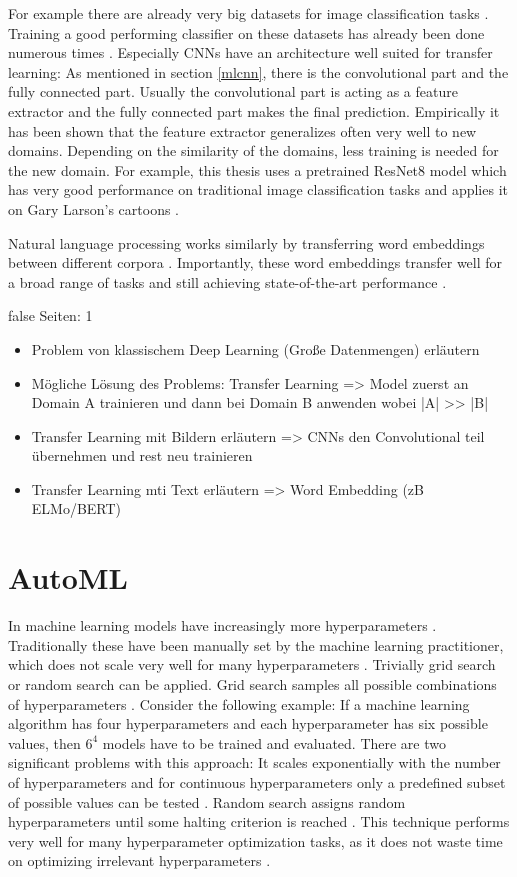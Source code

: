 \documentclass[draft,final,oneside]{vutinfth} %
\begin{document}
For example there are already very big datasets for image classification tasks \cite{alexnet}. Training a good performing classifier on these datasets has already been done numerous times \cite{resnet}\cite{alexnet}. Especially CNNs have an architecture well suited for transfer learning: As mentioned in section \ref{mlcnn}, there is the convolutional part and the fully connected part. Usually the convolutional part is acting as a feature extractor and the fully connected part makes the final prediction. Empirically it has been shown that the feature extractor generalizes often very well to new domains. Depending on the similarity of the domains, less training is needed for the new domain. For example, this thesis uses a pretrained ResNet8 model which has very good performance on traditional image classification tasks and applies it on Gary Larson's cartoons \cite{resnet}.

Natural language processing works similarly by transferring word embeddings between different corpora \cite{bert}. Importantly, these word embeddings transfer well for a broad range of tasks and still achieving state-of-the-art performance \cite{elmo}.


\if false
Seiten: 1
\begin{itemize}
\item Problem von klassischem Deep Learning (Große Datenmengen) erläutern
\item Mögliche Lösung des Problems: Transfer Learning => Model zuerst an Domain A trainieren und dann bei Domain B anwenden wobei |A| >> |B|
\item Transfer Learning mit Bildern erläutern => CNNs den Convolutional teil übernehmen und rest neu trainieren
\item Transfer Learning mti Text erläutern => Word Embedding (zB ELMo/BERT)
\end{itemize}
\fi


\section{AutoML} \label{automlbackground}

In machine learning models have increasingly more hyperparameters \cite{alexnet}\cite{resnet}. Traditionally these have been manually set by the machine learning practitioner, which does not scale very well for many hyperparameters \cite{aimodern}. Trivially grid search or random search can be applied. Grid search samples all possible combinations of hyperparameters \cite{automlsurvey}. Consider the following example: If a machine learning algorithm has four hyperparameters and each hyperparameter has six possible values, then $6^4$ models have to be trained and evaluated. There are two significant problems with this approach: It scales exponentially with the number of hyperparameters and for continuous hyperparameters only a predefined subset of possible values can be tested \cite{randomsearch}. Random search assigns random hyperparameters until some halting criterion is reached \cite{randomsearch}. This technique performs very well for many hyperparameter optimization tasks, as it does not waste time on optimizing irrelevant hyperparameters \cite{randomsearch}. 
\end{document}
